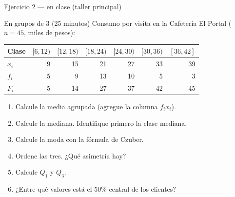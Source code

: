 \documentclass[aspectratio=169,10pt]{beamer}
\begin{document}
\begin{frame}{Ejercicio 2 — en clase (taller principal)}
  \begin{alertblock}{En grupos de 3 (25 minutos)}
    \scriptsize
    Consumo por visita en la Cafetería El Portal ($n = 45$, miles de pesos):

    \vspace{0.15cm}
    \centering
    \begin{tabular}{@{}lrrrrrr@{}}
      \toprule
      \textbf{Clase} & $[6,12)$ & $[12,18)$ & $[18,24)$ & $[24,30)$ &
      $[30,36)$ & $[36,42]$ \\
      \midrule
      $x_i$ &  9 & 15 & 21 & 27 & 33 & 39 \\
      $f_i$ &  5 &  9 & 13 & 10 &  5 &  3 \\
      $F_i$ &  5 & 14 & 27 & 37 & 42 & 45 \\
      \bottomrule
    \end{tabular}

    \vspace{0.2cm}
    \raggedright
    \begin{enumerate}\setlength{\itemsep}{-0.07cm}
      \item Calcule la media agrupada (agregue la columna $f_i x_i$).
      \item Calcule la mediana. Identifique primero la clase mediana.
      \item Calcule la moda con la fórmula de Czuber.
      \item Ordene las tres. ¿Qué asimetría hay?
      \item Calcule $Q_1$ y $Q_3$.
      \item ¿Entre qué valores está el 50\% central de los clientes?
    \end{enumerate}
  \end{alertblock}
\end{frame}
\end{document}

